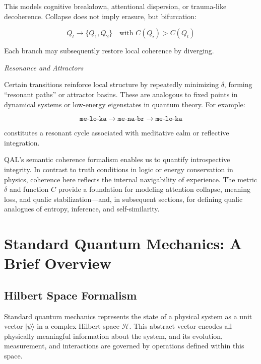 \documentclass[11pt]{article}
\numberwithin{equation}{section} %
\begin{document}
This models cognitive breakdown, attentional dispersion, or trauma-like decoherence. Collapse does not imply erasure, but bifurcation:

\begin{equation}
Q_t \rightarrow \{Q_1, Q_2\} \quad \text{with } C(Q_i) > C(Q_t)
\end{equation}

Each branch may subsequently restore local coherence by diverging.

\bigskip

\noindent \textit{Resonance and Attractors}

Certain transitions reinforce local structure by repeatedly minimizing \( \delta \), forming “resonant paths” or attractor basins. These are analogous to fixed points in dynamical systems or low-energy eigenstates in quantum theory. For example:

\begin{equation}
\texttt{me-lo-ka} \rightarrow \texttt{me-na-br} \rightarrow \texttt{me-lo-ka}
\end{equation}

constitutes a resonant cycle associated with meditative calm or reflective integration.

QAL’s semantic coherence formalism enables us to quantify introspective integrity. In contrast to truth conditions in logic or energy conservation in physics, coherence here reflects the internal navigability of experience. The metric \( \delta \) and function \( C \) provide a foundation for modeling attention collapse, meaning loss, and qualic stabilization—and, in subsequent sections, for defining qualic analogues of entropy, inference, and self-similarity.

\section{Standard Quantum Mechanics: A Brief Overview}

\subsection{Hilbert Space Formalism}

Standard quantum mechanics represents the state of a physical system as a unit vector \( |\psi\rangle \) in a complex Hilbert space \( \mathcal{H} \). This abstract vector encodes all physically meaningful information about the system, and its evolution, measurement, and interactions are governed by operations defined within this space.
\end{document}
